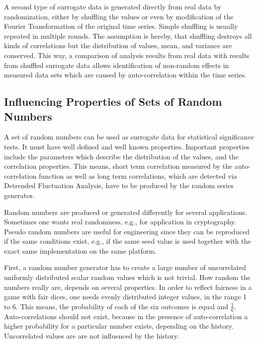 \documentclass[a4paper,10pt]{scrbook}
\begin{document}
A second type of surrogate data is generated directly from real data by randomization, either by shuffling the values or even by modification of the Fourier Transformation of the original time series. Simple shuffling is usually repeated in multiple rounds. The assumption is hereby, that shuffling destroys all kinds of correlations but the distribution of values, mean, and variance are conserved. This way, a comparison of analysis results from real data with results from shuffled surrogate data allows identification of non-random effects in measured data sets which are caused by auto-correlation within the time series. 

\subsection{Influencing Properties of Sets of Random Numbers}

%
%

A set of random numbers can be used as surrogate data for statistical significance tests. It must have well defined and well known properties. Important properties include
the parameters which describe the distribution of the values, and the correlation properties. This  means, short term correlation measured by the auto-correlation function as well as long term
correlations, which are detected via Detrended Fluctuation Analysis,  have to be produced by the random series generator.

Random numbers are produced or generated differently for several applications. Sometimes one wants real randomness, e.g., for application in cryptography. Pseudo random numbers are useful for engineering since they can be reproduced if the same conditions exist, e.g., if the same seed value is used together with the exact same implementation on the same platform.

First, a random number generator has to create a large number of uncorrelated
uniformly distributed scalar random values which is not trivial. How random the numbers really are, depends on several properties. In order to reflect fairness in a game with fair dices, one needs evenly distributed integer values, in the range 1 to 6. This means, the probability of each of the six outcomes is equal and $\frac{1}{6}$. Auto-correlations should not exist, because in the presence of auto-correlation a higher probability for a particular number exists, depending on the history. Uncorrelated values are are not influenced by the history.  
\end{document}
